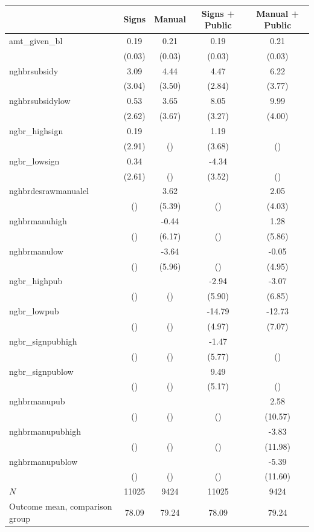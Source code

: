 \begin{tabular}{lcccc}
\hline\hline
 & Signs & Manual & Signs + Public & Manual + Public \\
\hline
amt_given_bl & 0.19 & 0.21 & 0.19 & 0.21 \\
 & (0.03) & (0.03) & (0.03) & (0.03) \\
nghbrsubsidy & 3.09 & 4.44 & 4.47 & 6.22 \\
 & (3.04) & (3.50) & (2.84) & (3.77) \\
nghbrsubsidylow & 0.53 & 3.65 & 8.05 & 9.99 \\
 & (2.62) & (3.67) & (3.27) & (4.00) \\
ngbr_highsign & 0.19 &  & 1.19 &  \\
 & (2.91) & () & (3.68) & () \\
ngbr_lowsign & 0.34 &  & -4.34 &  \\
 & (2.61) & () & (3.52) & () \\
nghbrdesrawmanualel &  & 3.62 &  & 2.05 \\
 & () & (5.39) & () & (4.03) \\
nghbrmanuhigh &  & -0.44 &  & 1.28 \\
 & () & (6.17) & () & (5.86) \\
nghbrmanulow &  & -3.64 &  & -0.05 \\
 & () & (5.96) & () & (4.95) \\
ngbr_highpub &  &  & -2.94 & -3.07 \\
 & () & () & (5.90) & (6.85) \\
ngbr_lowpub &  &  & -14.79 & -12.73 \\
 & () & () & (4.97) & (7.07) \\
ngbr_signpubhigh &  &  & -1.47 &  \\
 & () & () & (5.77) & () \\
ngbr_signpublow &  &  & 9.49 &  \\
 & () & () & (5.17) & () \\
nghbrmanupub &  &  &  & 2.58 \\
 & () & () & () & (10.57) \\
nghbrmanupubhigh &  &  &  & -3.83 \\
 & () & () & () & (11.98) \\
nghbrmanupublow &  &  &  & -5.39 \\
 & () & () & () & (11.60) \\
\hline
$N$ & 11025 & 9424 & 11025 & 9424 \\
Outcome mean, comparison group & 78.09 & 79.24 & 78.09 & 79.24 \\
\hline\hline
\end{tabular}
